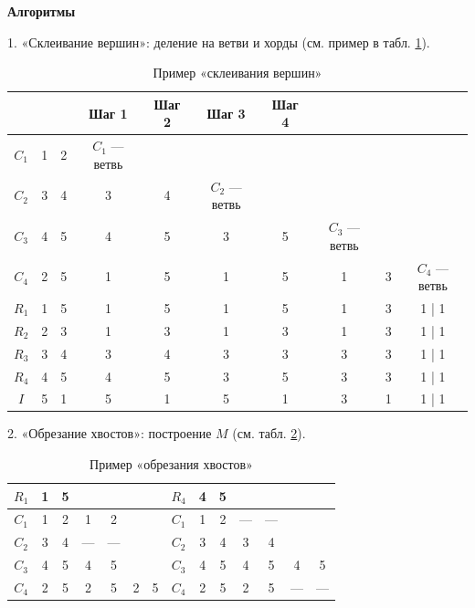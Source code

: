 	\textbf{Алгоритмы}
	
	1. «Склеивание вершин»: деление на ветви и хорды (см. пример в табл. \ref{tab:glue}).
	
	\begin{table}[H]
		\centering
		\begin{tabular}{|c|c|c|c|c|c|c|c|c|c|}
			\hline
			& & & Шаг 1 & Шаг 2 & Шаг 3 & Шаг 4 & \\
			\hline
			$C_1$ & 1 & 2 & $C_1$ — ветвь & & & & \\
			$C_2$ & 3 & 4 & 3 & 4 & $C_2$ — ветвь & & \\
			$C_3$ & 4 & 5 & 4 & 5 & 3 & 5 & $C_3$ — ветвь & \\
			$C_4$ & 2 & 5 & 1 & 5 & 1 & 5 & 1 & 3 & $C_4$ — ветвь \\
			$R_1$ & 1 & 5 & 1 & 5 & 1 & 5 & 1 & 3 & 1 | 1 \\
			$R_2$ & 2 & 3 & 1 & 3 & 1 & 3 & 1 & 3 & 1 | 1 \\
			$R_3$ & 3 & 4 & 3 & 4 & 3 & 3 & 3 & 3 & 1 | 1 \\
			$R_4$ & 4 & 5 & 4 & 5 & 3 & 5 & 3 & 3 & 1 | 1 \\
			$I$ & 5 & 1 & 5 & 1 & 5 & 1 & 3 & 1 & 1 | 1 \\
			\hline
		\end{tabular}
		\caption{Пример «склеивания вершин»}
		\label{tab:glue}
	\end{table}
	
	2. «Обрезание хвостов»: построение $M$ (см. табл. \ref{tab:cut}).
	
	\begin{table}[h]
		\centering
		\begin{tabular}{|c|c|c|c|c|c|c||c|c|c|c|c|c|c|}
			\hline
			$R_1$ & 1 & 5 & & & & & $R_4$ & 4 & 5 & & & & \\
			\hline
			$C_1$ & 1 & 2 & 1 & 2 & & & $C_1$ & 1 & 2 & — & — & & \\
			$C_2$ & 3 & 4 & — & — & & & $C_2$ & 3 & 4 & 3 & 4 & & \\
			$C_3$ & 4 & 5 & 4 & 5 & & & $C_3$ & 4 & 5 & 4 & 5 & 4 & 5 \\
			$C_4$ & 2 & 5 & 2 & 5 & 2 & 5 & $C_4$ & 2 & 5 & 2 & 5 & — & — \\
			\hline
		\end{tabular}
		\caption{Пример «обрезания хвостов»}
		\label{tab:cut}
	\end{table}
	
	
